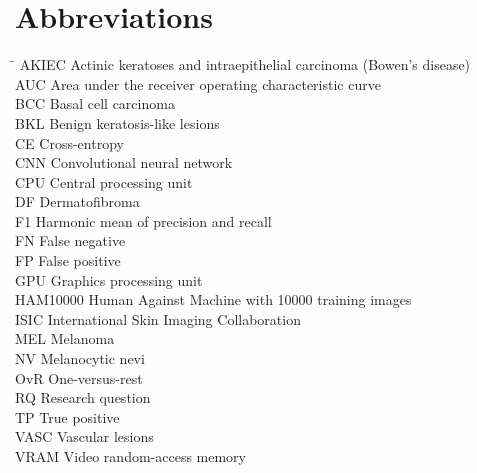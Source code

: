 \chapter*{Abbreviations}

\begin{tabbing}
\hspace{3.2cm}\= \kill
AKIEC \> Actinic keratoses and intraepithelial carcinoma (Bowen's disease) \\
AUC \> Area under the receiver operating characteristic curve \\
BCC \> Basal cell carcinoma \\
BKL \> Benign keratosis-like lesions \\
CE \> Cross-entropy \\
CNN \> Convolutional neural network \\
CPU \> Central processing unit \\
DF \> Dermatofibroma \\
F1 \> Harmonic mean of precision and recall \\
FN \> False negative \\
FP \> False positive \\
GPU \> Graphics processing unit \\
HAM10000 \> Human Against Machine with 10000 training images \\
ISIC \> International Skin Imaging Collaboration \\
MEL \> Melanoma \\
NV \> Melanocytic nevi \\
OvR \> One-versus-rest \\
RQ \> Research question \\
TP \> True positive \\
VASC \> Vascular lesions \\
VRAM \> Video random-access memory \\
\end{tabbing}
